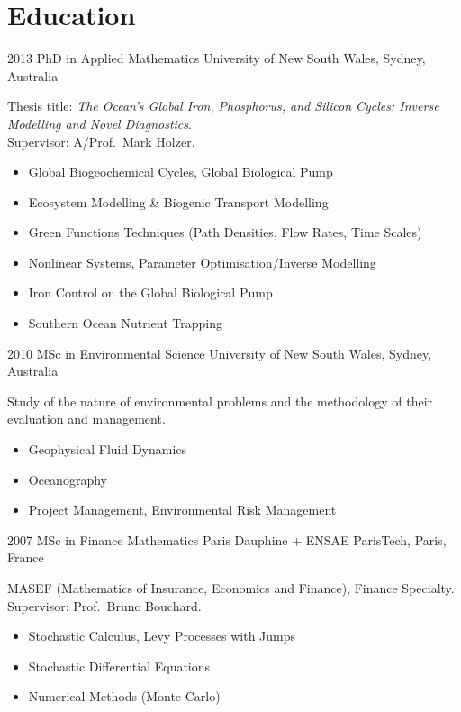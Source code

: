 
\section{Education}
\begin{entrylist}
  \entry
    {2013}
    {PhD in Applied Mathematics}
    {University of New South Wales, Sydney, Australia}
    {Thesis title: \emph{The Ocean's Global Iron, Phosphorus, and Silicon Cycles: Inverse Modelling and Novel Diagnostics}.\\
    Supervisor: A/Prof.~Mark Holzer.
    \begin{itemize}
        \item Global Biogeochemical Cycles, Global Biological Pump
        \item Ecosystem Modelling \& Biogenic Transport Modelling
        \item Green Functions Techniques (Path Densities, Flow Rates, Time Scales)
        \item Nonlinear Systems, Parameter Optimisation/Inverse Modelling
        \item Iron Control on the Global Biological Pump
        \item Southern Ocean Nutrient Trapping
    \end{itemize}
    }

  \entry
    {2010}
    {MSc in Environmental Science}
    {University of New South Wales, Sydney, Australia}
    {Study of the nature of environmental problems and the methodology of their evaluation and management.
    \begin{itemize}
      \item Geophysical Fluid Dynamics
      \item Oceanography
      \item Project Management, Environmental Risk Management
    \end{itemize}
    }

  \entry
    {2007}
    {MSc in Finance Mathematics}
    {Paris Dauphine + ENSAE ParisTech, Paris, France}
    {MASEF (Mathematics of Insurance, Economics and Finance), Finance Specialty.\\
    Supervisor: Prof.~Bruno Bouchard.
    \begin{itemize}
        \item Stochastic Calculus, Levy Processes with Jumps
        \item Stochastic Differential Equations
        \item Numerical Methods (Monte Carlo)
    \end{itemize}
    }


\end{entrylist}
